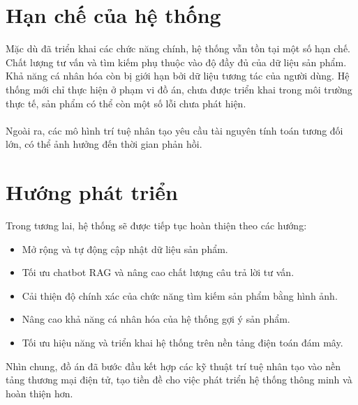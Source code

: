 \documentclass{report}
\begin{document}
\section{Hạn chế của hệ thống}
Mặc dù đã triển khai các chức năng chính,
hệ thống vẫn tồn tại một số hạn chế.
Chất lượng tư vấn và tìm kiếm phụ thuộc
vào độ đầy đủ của dữ liệu sản phẩm.
Khả năng cá nhân hóa còn bị giới hạn
bởi dữ liệu tương tác của người dùng.
Hệ thống mới chỉ thực hiện ở phạm vi đồ án, chưa được triển khai trong môi trường thực tế, sản phẩm có thể còn một số lỗi chưa phát hiện.\\\\
Ngoài ra, các mô hình trí tuệ nhân tạo
yêu cầu tài nguyên tính toán tương đối lớn,
có thể ảnh hưởng đến thời gian phản hồi.

\section{Hướng phát triển}
Trong tương lai, hệ thống sẽ được tiếp tục
hoàn thiện theo các hướng:
\begin{itemize}
    \item Mở rộng và tự động cập nhật dữ liệu sản phẩm.
    \item Tối ưu chatbot RAG và nâng cao chất lượng
    câu trả lời tư vấn.
    \item Cải thiện độ chính xác của chức năng
    tìm kiếm sản phẩm bằng hình ảnh.
    \item Nâng cao khả năng cá nhân hóa
    của hệ thống gợi ý sản phẩm.
    \item Tối ưu hiệu năng và triển khai hệ thống
    trên nền tảng điện toán đám mây.
\end{itemize}

Nhìn chung, đồ án đã bước đầu kết hợp
các kỹ thuật trí tuệ nhân tạo vào nền tảng
thương mại điện tử, tạo tiền đề cho việc
phát triển hệ thống thông minh và hoàn thiện hơn.
\end{document}
